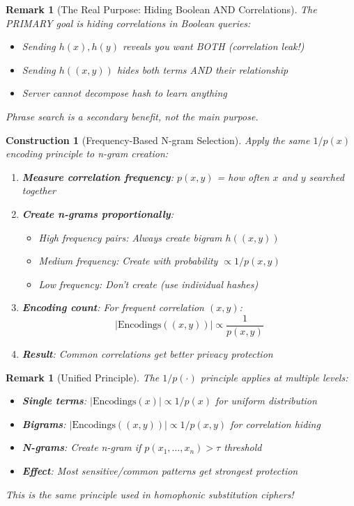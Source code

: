 \documentclass[11pt,final]{article}
\newtheorem{remark}[theorem]{Remark}
\newtheorem{construction}[theorem]{Construction}
\begin{document}
\begin{remark}[The Real Purpose: Hiding Boolean AND Correlations]
The PRIMARY goal is hiding correlations in Boolean queries:
\begin{itemize}
    \item Sending $h(x), h(y)$ reveals you want BOTH (correlation leak!)
    \item Sending $h((x,y))$ hides both terms AND their relationship
    \item Server cannot decompose hash to learn anything
\end{itemize}
Phrase search is a secondary benefit, not the main purpose.
\end{remark}

\begin{construction}[Frequency-Based N-gram Selection]
Apply the same $1/p(x)$ encoding principle to n-gram creation:
\begin{enumerate}
    \item \textbf{Measure correlation frequency}: $p(x,y)$ = how often $x$ and $y$ searched together
    \item \textbf{Create n-grams proportionally}: 
        \begin{itemize}
            \item High frequency pairs: Always create bigram $h((x,y))$
            \item Medium frequency: Create with probability $\propto 1/p(x,y)$
            \item Low frequency: Don't create (use individual hashes)
        \end{itemize}
    \item \textbf{Encoding count}: For frequent correlation $(x,y)$:
        \begin{equation}
        |\text{Encodings}((x,y))| \propto \frac{1}{p(x,y)}
        \end{equation}
    \item \textbf{Result}: Common correlations get better privacy protection
\end{enumerate}
\end{construction}

\begin{remark}[Unified Principle]
The $1/p(\cdot)$ principle applies at multiple levels:
\begin{itemize}
    \item \textbf{Single terms}: $|\text{Encodings}(x)| \propto 1/p(x)$ for uniform distribution
    \item \textbf{Bigrams}: $|\text{Encodings}((x,y))| \propto 1/p(x,y)$ for correlation hiding
    \item \textbf{N-grams}: Create n-gram if $p(x_1, \ldots, x_n) > \tau$ threshold
    \item \textbf{Effect}: Most sensitive/common patterns get strongest protection
\end{itemize}
This is the same principle used in homophonic substitution ciphers!
\end{remark}
\end{document}
